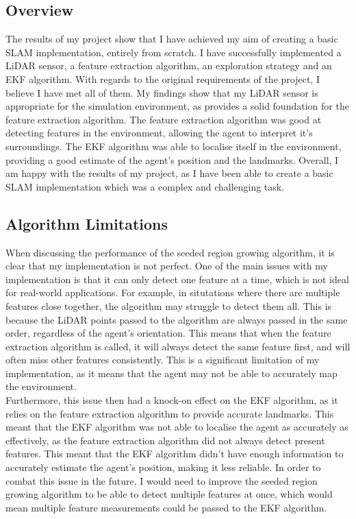 \documentclass[12pt]{article}
\begin{document}
\subsection{Overview}
The results of my project show that I have achieved my aim of creating a basic SLAM implementation, entirely from scratch. I have
successfully implemented a LiDAR sensor, a feature extraction algorithm, an exploration strategy and an EKF algorithm. With regards
to the original requirements of the project, I believe I have met all of them. My findings show that my LiDAR sensor is appropriate for
the simulation environment, as provides a solid foundation for the feature extraction algorithm. The feature extraction algorithm was
good at detecting features in the environment, allowing the agent to interpret it's surroundings. The EKF algorithm was able to localise
itself in the environment, providing a good estimate of the agent's position and the landmarks. Overall, I am happy with the results of
my project, as I have been able to create a basic SLAM implementation which was a complex and challenging task.\\

\subsection{Algorithm Limitations}
When discussing the performance of the seeded region growing algorithm, it is clear that my implementation is not perfect. One of the
main issues with my implementation is that it can only detect one feature at a time, which is not ideal for real-world applications. For
example, in situtations where there are multiple features close together, the algorithm may struggle to detect them all. This is because
the LiDAR points passed to the algorithm are always passed in the same order, regardless of the agent's orientation. This means that
when the feature extraction algorithm is called, it will always detect the same feature first, and will often miss other features consistently.
This is a significant limitation of my implementation, as it means that the agent may not be able to accurately map the environment.\\

Furthermore, this issue then had a knock-on effect on the EKF algorithm, as it relies on the feature extraction algorithm to provide
accurate landmarks. This meant that the EKF algorithm was not able to localise the agent as accurately as effectively, as the feature
extraction algorithm did not always detect present features. This meant that the EKF algorithm didn't have enough information to
accurately estimate the agent's position, making it less reliable. In order to combat this issue in the future, I would need to improve
the seeded region growing algorithm to be able to detect multiple features at once, which would mean multiple feature measurements
could be passed to the EKF algorithm. \\
\end{document}
